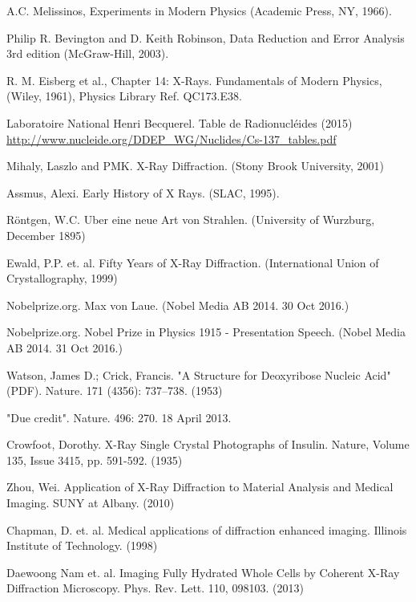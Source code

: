 \documentclass[%
 reprint,
 amsmath,amssymb,
 aps,
 pra,
]{revtex4-1}
\begin{document}
\begin{thebibliography}{6}
	
	A.C. Melissinos, Experiments in Modern Physics (Academic Press, NY, 1966).
	
	Philip R. Bevington and D. Keith Robinson, Data Reduction and Error Analysis 3rd edition (McGraw-Hill, 2003).
	
	R. M. Eisberg et al., Chapter 14: X-Rays. Fundamentals of Modern Physics,  (Wiley, 1961), Physics Library Ref. QC173.E38.

	Laboratoire National Henri Becquerel. Table de Radionucléides (2015) \url{http://www.nucleide.org/DDEP_WG/Nuclides/Cs-137_tables.pdf}
	
	Mihaly, Laszlo and PMK. X-Ray Diffraction. (Stony Brook University, 2001)
	
	Assmus, Alexi. Early History of X Rays. (SLAC, 1995).
	
	R\"{o}ntgen, W.C. Uber eine neue Art von Strahlen. (University of Wurzburg, December 1895)
	
	Ewald, P.P. et. al. Fifty Years of X-Ray Diffraction. (International Union of Crystallography, 1999)
	
	Nobelprize.org. Max von Laue.  (Nobel Media AB 2014. 30 Oct 2016.)
	
	Nobelprize.org. Nobel Prize in Physics 1915 - Presentation Speech. (Nobel Media AB 2014. 31 Oct 2016.)
	
	Watson, James D.; Crick, Francis. "A Structure for Deoxyribose Nucleic Acid" (PDF). Nature. 171 (4356): 737–738. (1953)
	
	 "Due credit". Nature. 496: 270. 18 April 2013.
	 
	 Crowfoot, Dorothy. X-Ray Single Crystal Photographs of Insulin. Nature, Volume 135, Issue 3415, pp. 591-592. (1935)
	 
	 Zhou, Wei. Application of X-Ray Diffraction to Material Analysis and Medical Imaging. SUNY at Albany. (2010)
	 
	 Chapman, D. et. al. Medical applications of diffraction enhanced imaging. Illinois Institute of Technology. (1998)
	 
	 Daewoong Nam et. al. Imaging Fully Hydrated Whole Cells by Coherent X-Ray Diffraction Microscopy. Phys. Rev. Lett. 110, 098103. (2013)
	 

\end{thebibliography}
\end{document}
